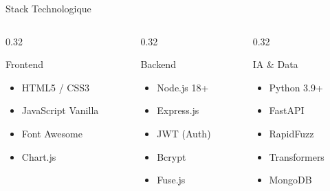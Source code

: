 \documentclass[aspectratio=169]{beamer}
\begin{document}
\begin{frame}{Stack Technologique}
    \begin{columns}[T]
        \begin{column}{0.32\textwidth}
            \begin{block}{Frontend}
                \begin{itemize}
                    \item HTML5 / CSS3
                    \item JavaScript Vanilla
                    \item Font Awesome
                    \item Chart.js
                \end{itemize}
            \end{block}
        \end{column}
        \begin{column}{0.32\textwidth}
            \begin{block}{Backend}
                \begin{itemize}
                    \item Node.js 18+
                    \item Express.js
                    \item JWT (Auth)
                    \item Bcrypt
                    \item Fuse.js
                \end{itemize}
            \end{block}
        \end{column}
        \begin{column}{0.32\textwidth}
            \begin{block}{IA \& Data}
                \begin{itemize}
                    \item Python 3.9+
                    \item FastAPI
                    \item RapidFuzz
                    \item Transformers
                    \item MongoDB
                \end{itemize}
            \end{block}
        \end{column}
    \end{columns}

    \vspace{0.5cm}


\end{frame}
\end{document}
